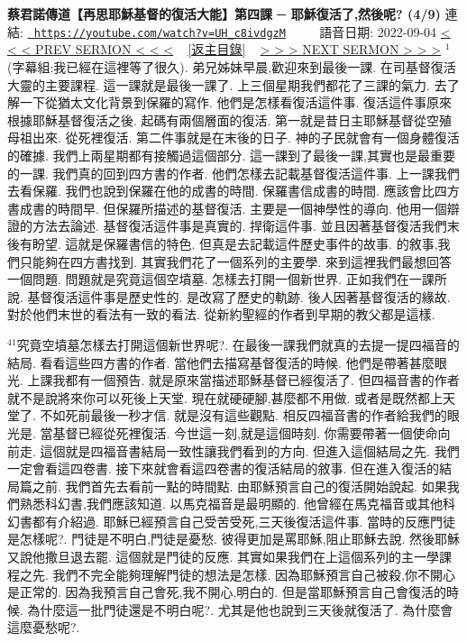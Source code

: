 \documentclass{book}
\begin{document}
\section{}
\label{sec:UH_c8ivdgzM}
\textbf{蔡君諾傳道【再思耶穌基督的復活大能】第四課 ─ 耶穌復活了,然後呢? (4/9)}
\newline
\newline
連結: \href{https://youtube.com/watch?v=UH_c8ivdgzM}{\texttt{ https://youtube.com/watch?v=UH\_c8ivdgzM}} ~~~~ 語音日期: 2022-09-04 
\newline
\newline
\hyperref[sec:VcMUdsC37SI]{\small{< < < PREV SERMON < < <}}
~
\hyperref[sec:index]{\small{[返主目錄]}}
~
\hyperref[sec:6Yg3FVlhsxs]{\small{> > > NEXT SERMON > > >}}
\newline
\newline
$^{1}$(字幕組:我已經在這裡等了很久).
弟兄姊妹早晨,歡迎來到最後一課.
在司基督復活大靈的主要課程.
這一課就是最後一課了.
上三個星期我們都花了三課的氣力.
去了解一下從猶太文化背景到保羅的寫作.
他們是怎樣看復活這件事.
復活這件事原來根據耶穌基督復活之後.
起碼有兩個層面的復活.
第一就是昔日主耶穌基督從空殖母祖出來.
從死裡復活.
第二件事就是在末後的日子.
神的子民就會有一個身體復活的確據.
我們上兩星期都有接觸過這個部分.
這一課到了最後一課,其實也是最重要的一課.
我們真的回到四方書的作者.
他們怎樣去記載基督復活這件事.
上一課我們去看保羅.
我們也說到保羅在他的成書的時間.
保羅書信成書的時間.
應該會比四方書成書的時間早.
但保羅所描述的基督復活.
主要是一個神學性的導向.
他用一個辯證的方法去論述.
基督復活這件事是真實的.
捍衛這件事.
並且因著基督復活我們末後有盼望.
這就是保羅書信的特色.
但真是去記載這件歷史事件的故事.
的敘事,我們只能夠在四方書找到.
其實我們花了一個系列的主要學.
來到這裡我們最想回答一個問題.
問題就是究竟這個空墳墓.
怎樣去打開一個新世界.
正如我們在一課所說.
基督復活這件事是歷史性的.
是改寫了歷史的軌跡.
後人因著基督復活的緣故.
對於他們末世的看法有一致的看法.
從新約聖經的作者到早期的教父都是這樣.

$^{41}$究竟空墳墓怎樣去打開這個新世界呢?.
在最後一課我們就真的去提一提四福音的結局.
看看這些四方書的作者.
當他們去描寫基督復活的時候.
他們是帶著甚麼眼光.
上課我都有一個預告.
就是原來當描述耶穌基督已經復活了.
但四福音書的作者就不是說將來你可以死後上天堂.
現在就硬硬腳,甚麼都不用做.
或者是既然都上天堂了.
不如死前最後一秒才信.
就是沒有這些觀點.
相反四福音書的作者給我們的眼光是.
當基督已經從死裡復活.
今世這一刻,就是這個時刻.
你需要帶著一個使命向前走.
這個就是四福音書結局一致性讓我們看到的方向.
但進入這個結局之先.
我們一定會看這四卷書.
接下來就會看這四卷書的復活結局的敘事.
但在進入復活的結局篇之前.
我們首先去看前一點的時間點.
由耶穌預言自己的復活開始說起.
如果我們熟悉科幻書,我們應該知道.
以馬克福音是最明顯的.
他曾經在馬克福音或其他科幻書都有介紹過.
耶穌已經預言自己受苦受死,三天後復活這件事.
當時的反應門徒是怎樣呢?.
門徒是不明白,門徒是憂愁.
彼得更加是罵耶穌,阻止耶穌去說.
然後耶穌又說他撒旦退去罷.
這個就是門徒的反應.
其實如果我們在上這個系列的主一學課程之先.
我們不完全能夠理解門徒的想法是怎樣.
因為耶穌預言自己被殺,你不開心是正常的.
因為我預言自己會死,我不開心,明白的.
但是當耶穌預言自己會復活的時候.
為什麼這一批門徒還是不明白呢?.
尤其是他也說到三天後就復活了.
為什麼會這麼憂愁呢?.
\end{document}
